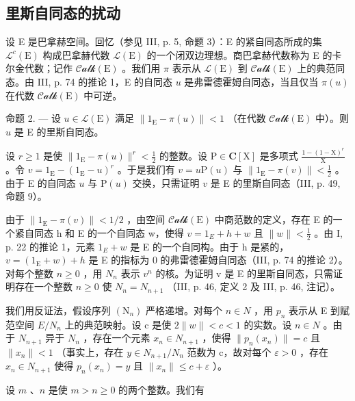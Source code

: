 \subsection{里斯自同态的扰动}

设 E 是巴拿赫空间。回忆（参见 III, p. 5, 命题 3）：E 的紧自同态所成的集 \(\mathcal{L}^c (\mathrm{E})\) 构成巴拿赫代数 \(\mathcal{L}(\mathrm{E})\) 的一个闭双边理想。商巴拿赫代数称为 E 的卡尔金代数；记作 \(\mathcal{Calk}(\mathrm{E})\) 。我们用 \(\pi\) 表示从 \(\mathcal{L}(\mathrm{E})\) 到 \(\mathcal{Calk}(\mathrm{E})\) 上的典范同态。由 III, p. 74 的推论 1，E 的自同态 \(u\) 是弗雷德霍姆自同态，当且仅当 \(\pi (u)\) 在代数 \(\mathcal{Calk}(\mathrm{E})\) 中可逆。

命题 2. --- 设 \(u \in \mathcal{L}(\mathrm{E})\) 满足 \(\|1_{\mathrm{E}} - \pi(u)\| < 1\) （在代数 \(\mathcal{Calk}(\mathrm{E})\) 中）。则 \(u\) 是 E 的里斯自同态。

设 \(r \geqslant 1\) 是使 \(\| 1_{\mathrm{E}} - \pi(u)\|^{r} < \frac{1}{2}\) 的整数。设 \(\mathrm{P} \in \mathbf{C}[\mathrm{X}]\) 是多项式 \(\frac{1 - (1 - \mathrm{X})^r}{\mathrm{X}}\) 。令 \(v = 1_{\mathrm{E}} - (1_{\mathrm{E}} - u)^r\) 。于是我们有 \(v = u\mathrm{P}(u)\) 与 \(\| 1_{\mathrm{E}} - \pi(v)\| < \frac{1}{2}\) 。由于 E 的自同态 \(u\) 与 \(\mathrm{P}(u)\) 交换，只需证明 \(v\) 是 E 的里斯自同态（III, p. 49, 命题 9）。

由于 \(\|1_{\mathrm{E}}-\pi(v)\|<1/2\) ，由空间 \(\mathcal{Calk}(\mathrm{E})\) 中商范数的定义，存在 E 的一个紧自同态 h 和 E 的一个自同态 w，使得 \(v=1_{E}+h+w\) 且 \(\|w\|<\frac{1}{2}\) 。由 I, p. 22 的推论 1，元素 \(1_{E}+w\) 是 E 的一个自同构。由于 h 是紧的，\(v=(1_{\mathrm{E}}+w)+h\) 是 E 的指标为 0 的弗雷德霍姆自同态（III, p. 74 的推论 2）。对每个整数 \(n\geqslant0\) ，用 \(N_{n}\) 表示 \(v^{n}\) 的核。为证明 v 是 E 的里斯自同态，只需证明存在一个整数 \(n \geqslant 0\) 使 \(N_{n} = N_{n+1}\) （III, p. 46, 定义 2 及 III, p. 46, 注记）。

我们用反证法，假设序列 \((\mathrm{N}_{n})\) 严格递增。对每个 \(n \in N\) ，用 \(p_{n}\) 表示从 E 到赋范空间 \(E/N_{n}\) 上的典范映射。设 c 是使 \(2\|w\| < c < 1\) 的实数。设 \(n \in N\) 。由于 \(N_{n+1}\) 异于 \(N_{n}\) ，存在一个元素 \(x_{n} \in N_{n+1}\) ，使得 \(\|p_{n}(x_{n})\| = c\) 且 \(\|x_{n}\| < 1\) （事实上，存在 \(y \in N_{n+1}/N_{n}\) 范数为 c，故对每个 \(\varepsilon > 0\) ，存在 \(x_{n} \in N_{n+1}\) 使得 \(p_{n}(x_{n}) = y\) 且 \(\|x_{n}\| \leqslant c + \varepsilon\) ）。

设 \(m\) 、\(n\) 是使 \(m > n \geqslant 0\) 的两个整数。我们有

